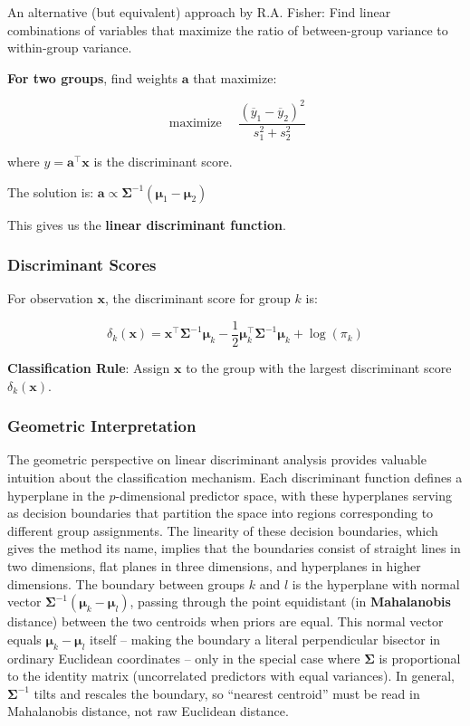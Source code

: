 \documentclass[
]{article}
\begin{document}
An alternative (but equivalent) approach by R.A. Fisher: Find linear
combinations of variables that maximize the ratio of between-group
variance to within-group variance.

\textbf{For two groups}, find weights \(\mathbf{a}\) that maximize:

\[\text{ maximize }\quad\frac{\left( {\overline{y}}_{1} - {\overline{y}}_{2} \right)^{2}}{s_{1}^{2} + s_{2}^{2}}\]

where \(y = \mathbf{a}^{\top}\mathbf{x}\) is the discriminant score.

The solution is:
\(\mathbf{a} \propto \mathbf{\Sigma}^{- 1}\left( \mathbf{\mu}_{1} - \mathbf{\mu}_{2} \right)\)

This gives us the \textbf{linear discriminant function}.

\subsubsection{Discriminant Scores}

For observation \(\mathbf{x}\), the discriminant score for group \(k\)
is:

\[\delta_{k}\left( \mathbf{x} \right) = \mathbf{x}^{\top}\mathbf{\Sigma}^{- 1}\mathbf{\mu}_{k} - \frac{1}{2}\mathbf{\mu}_{k}^{\top}\mathbf{\Sigma}^{- 1}\mathbf{\mu}_{k} + \log(\pi_{k})\]

\textbf{Classification Rule}: Assign \(\mathbf{x}\) to the group with
the largest discriminant score \(\delta_{k}\left( \mathbf{x} \right)\).

\subsubsection{Geometric Interpretation}

The geometric perspective on linear discriminant analysis provides
valuable intuition about the classification mechanism. Each discriminant
function defines a hyperplane in the \(p\)-dimensional predictor space,
with these hyperplanes serving as decision boundaries that partition the
space into regions corresponding to different group assignments. The
linearity of these decision boundaries, which gives the method its name,
implies that the boundaries consist of straight lines in two dimensions,
flat planes in three dimensions, and hyperplanes in higher dimensions.
The boundary between groups \(k\) and \(l\) is the hyperplane with
normal vector
\(\mathbf{\Sigma}^{- 1}\left( \mathbf{\mu}_{k} - \mathbf{\mu}_{l} \right)\),
passing through the point equidistant (in \textbf{Mahalanobis} distance)
between the two centroids when priors are equal. This normal vector
equals \(\mathbf{\mu}_{k} - \mathbf{\mu}_{l}\) itself -- making the
boundary a literal perpendicular bisector in ordinary Euclidean
coordinates -- only in the special case where \(\mathbf{\Sigma}\) is
proportional to the identity matrix (uncorrelated predictors with equal
variances). In general, \(\mathbf{\Sigma}^{- 1}\) tilts and rescales the
boundary, so ``nearest centroid'' must be read in Mahalanobis distance,
not raw Euclidean distance.
\end{document}
